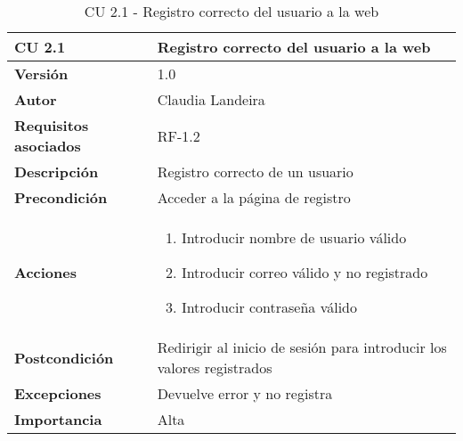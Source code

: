 \begin{table}[p]
	\centering
	\begin{tabularx}{\linewidth}{ p{} p{} }
		\toprule
		\textbf{CU 2.1}    & \textbf{Registro correcto del usuario a la web}\\
		\toprule
		\textbf{Versión}              & 1.0    \\
		\textbf{Autor}                & Claudia Landeira \\
		\textbf{Requisitos asociados} & RF-1.2\\
		\textbf{Descripción}          & Registro correcto de un usuario\\
		\textbf{Precondición}         & Acceder a la página de registro\\
		\textbf{Acciones}             &
		\begin{enumerate}
			\def\labelenumi{\arabic{enumi}.}
			\tightlist
                \item Introducir nombre de usuario válido
			\item Introducir correo válido y no registrado
			\item Introducir contraseña válido
		\end{enumerate}\\
		\textbf{Postcondición}        & Redirigir al inicio de sesión para introducir los valores registrados \\
		\textbf{Excepciones}          & Devuelve error y no registra \\
		\textbf{Importancia}          & Alta \\
		\bottomrule
	\end{tabularx}
	\caption{CU 2.1 - Registro correcto del usuario a la web}
\end{table}

